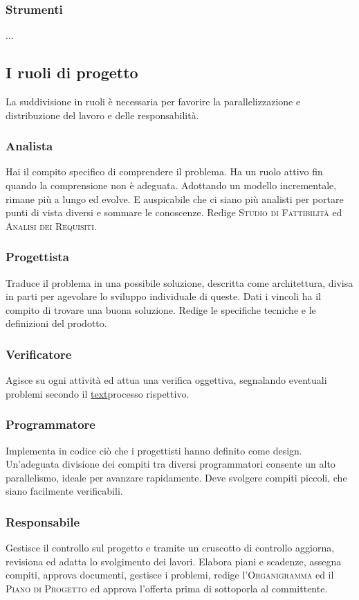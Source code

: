     \subsubsection{Strumenti}
    ...

\subsection{I ruoli di progetto}
    La suddivisione in ruoli è necessaria per favorire la parallelizzazione e distribuzione del lavoro e delle responsabilità.
    \subsubsection{Analista}
    Hai il compito specifico di comprendere il problema. Ha un ruolo attivo fin quando la comprensione non è adeguata. Adottando un modello incrementale, rimane più a lungo ed evolve. E auspicabile che ci siano più analisti per portare punti di vista diversi e sommare le conoscenze. Redige \textsc{Studio di Fattibilità} ed \textsc{Analisi dei Requisiti}.
    \subsubsection{Progettista}
    Traduce il problema in una possibile soluzione, descritta come architettura, divisa in parti per agevolare lo sviluppo individuale di queste. Dati i vincoli ha il compito di trovare una buona soluzione. Redige le specifiche tecniche e le definizioni del prodotto.
    \subsubsection{Verificatore}
    Agisce su ogni attività ed attua una verifica oggettiva, segnalando eventuali problemi secondo il \hyperref[label]{text}{processo rispettivo}.
    \subsubsection{Programmatore}
    Implementa in codice ciò che i progettisti hanno definito come design. Un'adeguata divisione dei compiti tra diversi programmatori consente un alto parallelismo, ideale per avanzare rapidamente. Deve svolgere compiti piccoli, che siano facilmente verificabili.
    \subsubsection{Responsabile}
    Gestisce il controllo sul progetto e tramite un cruscotto di controllo aggiorna, revisiona ed adatta lo svolgimento dei lavori. Elabora piani e scadenze, assegna compiti, approva documenti, gestisce i problemi, redige l'\textsc{Organigramma} ed il \textsc{Piano di Progetto} ed approva l'offerta prima di sottoporla al committente.
